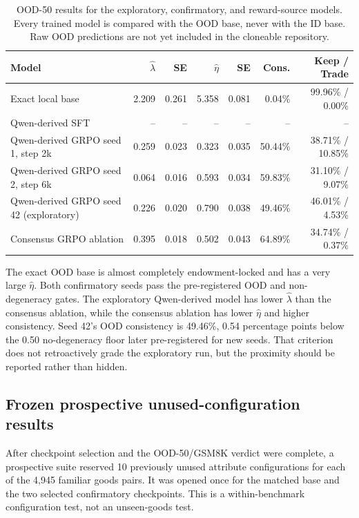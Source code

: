 \documentclass[11pt,letterpaper]{article}
\begin{document}
\begin{table}[htbp]
\centering
\scriptsize
\begin{tabular}{lrrrrrr}
\toprule
Model & $\widehat\lambda$ & SE & $\widehat\eta$ & SE & Cons. & Keep / Trade \\
\midrule
Exact local base & 2.209 & 0.261 & 5.358 & 0.081 & 0.04\% & 99.96\% / 0.00\% \\
Qwen-derived SFT & -- & -- & -- & -- & -- & -- \\
Qwen-derived GRPO seed 1, step 2k & 0.259 & 0.023 & 0.323 & 0.035 & 50.44\% & 38.71\% / 10.85\% \\
Qwen-derived GRPO seed 2, step 6k & 0.064 & 0.016 & 0.593 & 0.034 & 59.83\% & 31.10\% / 9.07\% \\
Qwen-derived GRPO seed 42 (exploratory) & 0.226 & 0.020 & 0.790 & 0.038 & 49.46\% & 46.01\% / 4.53\% \\
Consensus GRPO ablation & 0.395 & 0.018 & 0.502 & 0.043 & 64.89\% & 34.74\% / 0.37\% \\
\bottomrule
\end{tabular}
\caption{OOD-50 results for the exploratory, confirmatory, and reward-source
models. Every trained model is compared with the OOD base, never with the ID
base. Raw OOD predictions are not yet included in the cloneable repository.}
\label{tab:ood-results}
\end{table}

The exact OOD base is almost completely endowment-locked and has a very large
$\widehat\eta$. Both confirmatory seeds pass the pre-registered OOD and
non-degeneracy gates. The exploratory Qwen-derived model has lower
$\widehat\lambda$ than the consensus ablation, while the consensus ablation
has lower $\widehat\eta$ and higher consistency. Seed 42's OOD consistency is
49.46\%, 0.54 percentage points below the 0.50 no-degeneracy floor later
pre-registered for new seeds. That criterion does not retroactively grade the
exploratory run, but the proximity should be reported rather than hidden.

\subsection{Frozen prospective unused-configuration results}

After checkpoint selection and the OOD-50/GSM8K verdict were complete, a
prospective suite reserved 10 previously unused attribute configurations for
each of the 4,945 familiar goods pairs. It was opened once for the matched base
and the two selected confirmatory checkpoints. This is a within-benchmark
configuration test, not an unseen-goods test.
\end{document}
